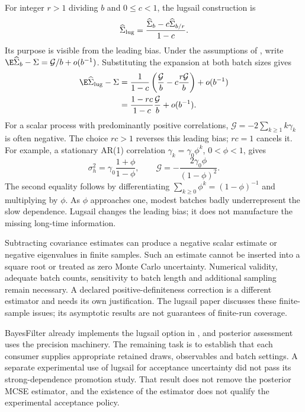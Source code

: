 For integer $r>1$ dividing $b$ and $0\leq c<1$, the lugsail construction is
\begin{equation}
 \widehat\Sigma_{\rm lug}
    =\frac{\widehat\Sigma_b-c\widehat\Sigma_{b/r}}{1-c}.
 \label{eq:bf-modern-lugsail}
\end{equation}
Its purpose is visible from the leading bias. Under the assumptions of
\citet[Theorem 4]{vats2021lugsail}, write
$\E\widehat\Sigma_b-\Sigma=\mathcal G/b+o(b^{-1})$.
Substituting the expansion at both batch sizes gives
\begin{align}
 \E\widehat\Sigma_{\rm lug}-\Sigma
 &=\frac{1}{1-c}
       \left(\frac{\mathcal G}{b}
                   -c\frac{r\mathcal G}{b}\right)+o(b^{-1})\\
 &=\frac{1-rc}{1-c}\frac{\mathcal G}{b}+o(b^{-1}).
 \label{eq:bf-modern-lugsail-bias}
\end{align}
For a scalar process with predominantly positive correlations,
$\mathcal G=-2\sum_{k\geq1}k\gamma_k$ is often negative. The choice
$rc>1$ reverses this leading bias; $rc=1$ cancels it. For example, a
stationary AR(1) correlation $\gamma_k=\gamma_0\phi^k$, $0<\phi<1$,
gives
\begin{equation}
 \sigma_h^2=\gamma_0\frac{1+\phi}{1-\phi},\qquad
 \mathcal G=-\frac{2\gamma_0\phi}{(1-\phi)^2}.
 \label{eq:bf-modern-ar1-batch-bias}
\end{equation}
The second equality follows by differentiating
$\sum_{k\geq0}\phi^k=(1-\phi)^{-1}$ and multiplying by $\phi$.
As $\phi$ approaches one, modest batches badly underrepresent the slow
dependence. Lugsail changes the leading bias; it does not manufacture the
missing long-time information.

Subtracting covariance estimates can produce a negative scalar estimate or
negative eigenvalues in finite samples. Such an estimate cannot be inserted
into a square root or treated as zero Monte Carlo uncertainty. Numerical
validity, adequate batch counts, sensitivity to batch length and additional
sampling remain necessary. A declared positive-definiteness correction is a
different estimator and needs its own justification. The lugsail paper
discusses these finite-sample issues; its asymptotic results are not guarantees
of finite-run coverage.

BayesFilter already implements the lugsail option in
, and posterior assessment uses
the precision machinery. The remaining task is to establish that each
consumer supplies appropriate retained draws, observables and batch settings.
A separate experimental use of lugsail for acceptance uncertainty did not
pass its strong-dependence promotion study. That result does not remove the
posterior MCSE estimator, and the existence of the estimator does not qualify
the experimental acceptance policy.

